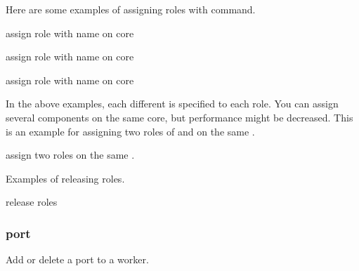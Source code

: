 \documentclass[a4paper,11pt,openany,oneside,english]{sphinxmanual}
\begin{document}
Here are some examples of assigning roles with  command.

\begin{sphinxVerbatim}[commandchars=\\\{\},formatcom=\footnotesize]
 assign  role with name  on core 

 assign  role with name  on core 

 assign  role with name  on core 
\end{sphinxVerbatim}

In the above examples, each different  is specified to each role.
You can assign several components on the same core, but performance might be
decreased. This is an example for assigning two roles of  and
 on the same .

\begin{sphinxVerbatim}[commandchars=\\\{\},formatcom=\footnotesize]
 assign two roles on the same .
\end{sphinxVerbatim}

Examples of releasing roles.

\begin{sphinxVerbatim}[commandchars=\\\{\},formatcom=\footnotesize]
 release roles
\end{sphinxVerbatim}


\subsubsection{port}
\label{\detokenize{commands/secondary/spp_vf:port}}\label{\detokenize{commands/secondary/spp_vf:commands-spp-vf-port}}
Add or delete a port to a worker.
\end{document}

